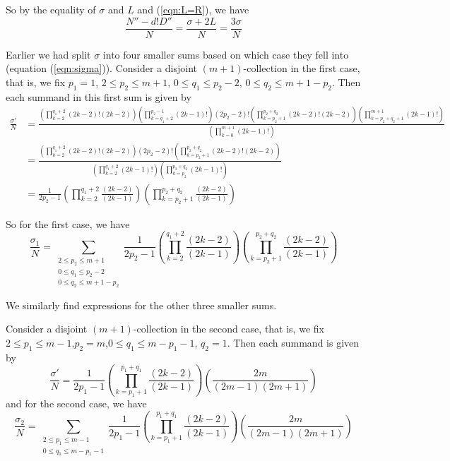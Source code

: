 \documentclass[11pt]{article}
\theoremstyle{mythm}
\begin{document}
So by the equality of $\sigma$ and $L$ and (\ref{eqn:L=R}), we have
\begin{equation*}
\frac{N''-d!D''}{N} = \frac{\sigma + 2L}{N} = \frac{3\sigma}{N}
\end{equation*}

Earlier we had split $\sigma$ into four smaller sums based on which case they fell into (equation (\ref{eqn:sigma})). Consider a disjoint $(m+1)$-collection in the first case, that is, we fix $p_1 = 1$, $2\leq p_2\leq m+1$, $0\leq q_1\leq p_2 - 2$, $0\leq q_2 \leq m+1-p_2$. Then each summand in this first sum is given by
\begin{align*}
\frac{\sigma'}{N} &= \frac{\left(\prod\limits_{k=2}^{q_1+2}(2k-2)!(2k-2)\right)\left(\prod\limits_{k=q_1+2}^{p_2-1}(2k-1)!\right)(2p_2-2)!\left(\prod\limits_{k=p_2+1}^{p_2+q_2}(2k-2)!(2k-2)\right)\left(\prod\limits_{k=p_2+q_2+1}^{m+1}(2k-1)!\right)}{\left(\prod\limits_{k=0}^{m+1}(2k-1)!\right)} \\
&= \frac{\left(\prod\limits_{k=2}^{q_1+2}(2k-2)!(2k-2)\right)(2p_2-2)!\left(\prod\limits_{k=p_2+1}^{p_2+q_2}(2k-2)!(2k-2)\right)}{\left(\prod\limits_{k=2}^{q_1+2}(2k-1)!\right)\left(\prod\limits_{k=p_2}^{p_2+q_2}(2k-1)!\right)} \\
&= \frac{1}{2p_2-1}\left(\prod\limits_{k=2}^{q_1+2}\frac{(2k-2)}{(2k-1)}\right)\left(\prod\limits_{k=p_2+1}^{p_2+q_2}\frac{(2k-2)}{(2k-1)}\right)
\end{align*}

So for the first case, we have
\begin{equation}\label{eqn:sigma1}
\frac{\sigma_1}{N} = \sum\limits_{\substack{2\leq p_2\leq m+1 \\ 0\leq q_1 \leq p_2-2 \\ 0\leq q_2 \leq m+1-p_2}}\frac{1}{2p_2-1}\left(\prod\limits_{k=2}^{q_1+2}\frac{(2k-2)}{(2k-1)}\right)\left(\prod\limits_{k=p_2+1}^{p_2+q_2}\frac{(2k-2)}{(2k-1)}\right)
\end{equation}

We similarly find expressions for the other three smaller sums.

Consider a disjoint $(m+1)$-collection in the second case, that is, we fix $2\leq p_1\leq m-1$,$p_2=m$,$0\leq q_1\leq m-p_1-1$, $q_2 = 1$. Then each summand is given by
\begin{equation*}
\frac{\sigma'}{N} = \frac{1}{2p_1-1}\left(\prod\limits_{k=p_1+1}^{p_1+q_1}\frac{(2k-2)}{(2k-1)}\right)\left(\frac{2m}{(2m-1)(2m+1)}\right)
\end{equation*}
and for the second case, we have
\begin{equation}\label{eqn:sigma2}
\frac{\sigma_2}{N} = \sum\limits_{\substack{2\leq p_1\leq m-1 \\ 0\leq q_1\leq m-p_1-1}}\frac{1}{2p_1-1}\left(\prod\limits_{k=p_1+1}^{p_1+q_1}\frac{(2k-2)}{(2k-1)}\right)\left(\frac{2m}{(2m-1)(2m+1)}\right)
\end{equation}
\end{document}
